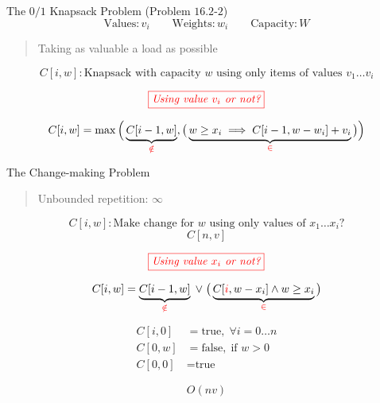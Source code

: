 \begin{frame}{}
  \begin{exampleblock}{The $0/1$ Knapsack Problem (Problem $16.2$-$2$)}
    \[
      \text{Values}: v_{i}  \qquad \text{Weights}: w_{i}  \qquad \text{Capacity}: W
    \]

    \begin{quote}
      \centering
      Taking as valuable a load as possible
    \end{quote}
  \end{exampleblock}

  \pause
  \[
    C[i, w]: \text{Knapsack with capacity $w$ using only items of values $v_{1} \dots v_{i}$}
  \]

  \[
    \textcolor{red}{\fbox{\it Using value $v_{i}$ or not?}}
  \]

  \[
    C[i,w] = \max \Big(\underbrace{C[i-1, w]}_{\textcolor{red}{\notin}}, \big(\underbrace{w \ge x_{i} \implies C[i-1, w-w_{i}] + v_{i}}_{\textcolor{red}{\in}}\big) \Big)
  \]
\end{frame}

\begin{frame}{}
  \begin{exampleblock}{The Change-making Problem}
    \begin{quote}
      \centering
      Unbounded repetition: $\infty$
    \end{quote}
  \end{exampleblock}

  \pause
  \[
    C[i, w]: \text{Make change for $w$ using only values of $x_{1} \dots x_{i}$?}
  \]
  \[
    C[n,v]
  \]

  \pause
  \[
    \textcolor{red}{\fbox{\it Using value $x_{i}$ or not?}}
  \]

  \pause
  \[
    C[i,w] = \underbrace{C[i-1, w]}_{\textcolor{red}{\notin}} \;\lor\; \big(\underbrace{C[\textcolor{red}{i}, w-x_{i}] \land w \ge x_{i}}_{\textcolor{red}{\in}}\big)
  \]

  \pause
  \begin{align*}
    C[i,0] &= \text{true}, \; \forall i = 0 \dots n  \\
    C[0,w] &= \text{false}, \; \text{if } w > 0 \\
    C[0,0] &= \text{true}
  \end{align*}
  
  \[
    O(nv)
  \]
\end{frame}

